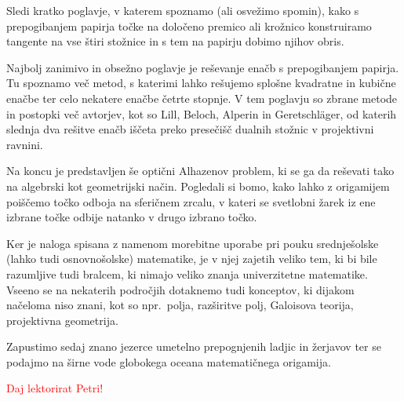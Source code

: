 Sledi kratko poglavje, v katerem spoznamo (ali osvežimo spomin), kako s prepogibanjem papirja točke na določeno premico ali krožnico konstruiramo tangente na vse štiri stožnice in s tem na papirju dobimo njihov obris.

Najbolj zanimivo in obsežno poglavje je reševanje enačb s prepogibanjem papirja. Tu spoznamo več metod, s katerimi lahko rešujemo splošne kvadratne in kubične enačbe ter celo nekatere enačbe četrte stopnje. V tem poglavju so zbrane metode in postopki več avtorjev, kot so Lill, Beloch, Alperin in Geretschläger, od katerih slednja dva rešitve enačb iščeta preko presečišč dualnih stožnic v projektivni ravnini.

Na koncu je predstavljen še optični Alhazenov problem, ki se ga da reševati tako na algebrski kot geometrijski način. Pogledali si bomo, kako lahko z origamijem poiščemo točko odboja na sferičnem zrcalu, v kateri se svetlobni žarek iz ene izbrane točke odbije natanko v drugo izbrano točko.

Ker je naloga spisana z namenom morebitne uporabe pri pouku srednješolske (lahko tudi osnovnošolske) matematike, je v njej zajetih veliko tem, ki bi bile razumljive tudi bralcem, ki nimajo veliko znanja univerzitetne matematike. Vseeno se na nekaterih področjih dotaknemo tudi konceptov, ki dijakom načeloma niso znani, kot so npr.\ polja, razširitve polj, Galoisova teorija, projektivna geometrija.

Zapustimo sedaj znano jezerce umetelno prepognjenih ladjic in žerjavov ter se podajmo na širne vode globokega oceana matematičnega origamija.

\textcolor{red}{Daj lektorirat Petri!}